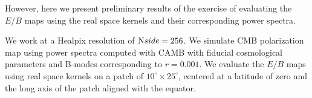 \documentclass[12pt]{article}
\begin{document}
However, here we present preliminary results of the exercise of evaluating the $E/B$ maps using the real space kernels and their corresponding power spectra. 
%
\begin{figure}[h]
\centering
{}
\caption{}
\end{figure}
%
We work at a Healpix resolution of ${\textrm Nside}=256$. We simulate CMB polarization map using power spectra computed with CAMB with fiducial cosmological parameters and B-modes corresponding to $r=0.001$. We evaluate the $E/B$ maps using real space kernels on a patch of $10 ^{\circ} \times 25^{\circ}$, centered at a latitude of zero and the long axis of the patch aligned with the equator. 
%
\end{document}

